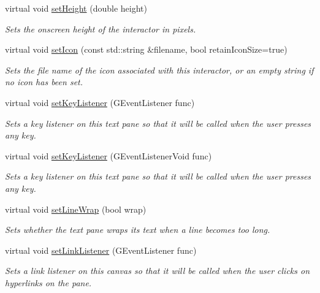 \begin{DoxyCompactItemize}
virtual void \mbox{\hyperlink{classGInteractor_a9e280bfc4544dfaf8e4376c4e1a74357}{set\+Height}} (double height)
\begin{DoxyCompactList}\small\item\em Sets the onscreen height of the interactor in pixels. \end{DoxyCompactList}\item 
virtual void \mbox{\hyperlink{classGInteractor_a762e139aa311461c3984d3ad28293f64}{set\+Icon}} (const std\+::string \&filename, bool retain\+Icon\+Size=true)
\begin{DoxyCompactList}\small\item\em Sets the file name of the icon associated with this interactor, or an empty string if no icon has been set. \end{DoxyCompactList}\item 
virtual void \mbox{\hyperlink{classGBrowserPane_aeb8324d3287fa1fbe093f4d6230cf0a6}{set\+Key\+Listener}} (G\+Event\+Listener func)
\begin{DoxyCompactList}\small\item\em Sets a key listener on this text pane so that it will be called when the user presses any key. \end{DoxyCompactList}\item 
virtual void \mbox{\hyperlink{classGBrowserPane_ae48ecea73606c7bd9423e1c7cc589cc9}{set\+Key\+Listener}} (G\+Event\+Listener\+Void func)
\begin{DoxyCompactList}\small\item\em Sets a key listener on this text pane so that it will be called when the user presses any key. \end{DoxyCompactList}\item 
virtual void \mbox{\hyperlink{classGBrowserPane_aaaafb06fec060b28b70ec3b7379657b4}{set\+Line\+Wrap}} (bool wrap)
\begin{DoxyCompactList}\small\item\em Sets whether the text pane wraps its text when a line becomes too long. \end{DoxyCompactList}\item 
virtual void \mbox{\hyperlink{classGBrowserPane_aaa849c4aed1fa43178314f5c76e43081}{set\+Link\+Listener}} (G\+Event\+Listener func)
\begin{DoxyCompactList}\small\item\em Sets a link listener on this canvas so that it will be called when the user clicks on hyperlinks on the pane. \end{DoxyCompactList}\item 

\end{DoxyCompactItemize}
